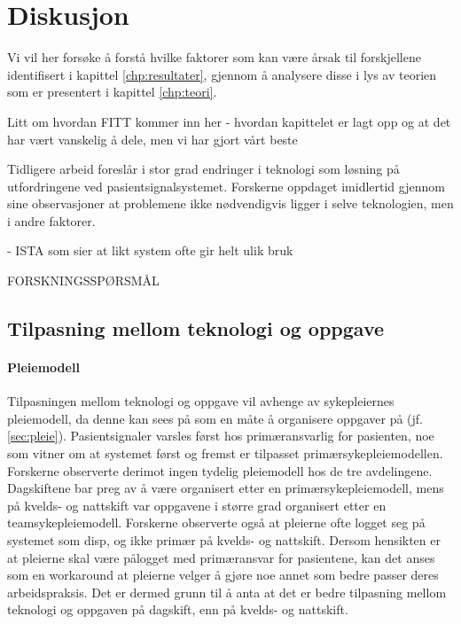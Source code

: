 \chapter{Diskusjon}
\label{chp:diskusjon}

Vi vil her forsøke å forstå hvilke faktorer som kan være årsak til forskjellene identifisert i kapittel \ref{chp:resultater}, gjennom å analysere disse i lys av teorien som er presentert i kapittel \ref{chp:teori}. 

Litt om hvordan FITT kommer inn her - hvordan kapittelet er lagt opp og at det har vært vanskelig å dele, men vi har gjort vårt beste

\noindent
Tidligere arbeid foreslår i stor grad endringer i teknologi som løsning på utfordringene ved pasientsignalsystemet. Forskerne oppdaget imidlertid gjennom sine observasjoner at problemene ikke nødvendigvis ligger i selve teknologien, men i andre faktorer. 

- ISTA som sier at likt system ofte gir helt ulik bruk

FORSKNINGSSPØRSMÅL

\section{Tilpasning mellom teknologi og oppgave}	

\subsubsection{Pleiemodell}	
Tilpasningen mellom teknologi og oppgave vil avhenge av sykepleiernes pleiemodell, da denne kan sees på som en måte å organisere oppgaver på (jf. \ref{sec:pleie}). Pasientsignaler varsles først hos primæransvarlig for pasienten, noe som vitner om at systemet først og fremst er tilpasset primærsykepleiemodellen. Forskerne observerte derimot ingen tydelig pleiemodell hos de tre avdelingene. Dagskiftene bar preg av å være organisert etter en primærsykepleiemodell, mens på kvelds- og nattskift var oppgavene i større grad organisert etter en teamsykepleiemodell. Forskerne observerte også at pleierne ofte logget seg på systemet som disp, og ikke primær på kvelds- og nattskift. Dersom hensikten er at pleierne skal være pålogget med primæransvar for pasientene, kan det anses som en workaround at pleierne velger å gjøre noe annet som bedre passer deres arbeidspraksis. Det er dermed grunn til å anta at det er bedre tilpasning mellom teknologi og oppgaven på dagskift, enn på kvelds- og nattskift. 

